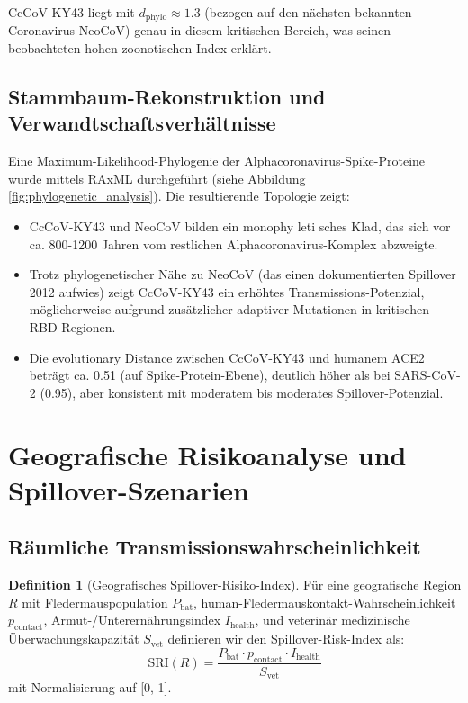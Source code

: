 ﻿\documentclass[11pt,a4paper]{article}
\theoremstyle{definition}
\newtheorem{definition}[theorem]{Definition}
\begin{document}
CcCoV-KY43 liegt mit $d_{\text{phylo}} \approx 1.3$ (bezogen auf den nächsten bekannten Coronavirus NeoCoV) genau in diesem kritischen Bereich, was seinen beobachteten hohen zoonotischen Index erklärt.

\subsection{Stammbaum-Rekonstruktion und Verwandtschaftsverhältnisse}

Eine Maximum-Likelihood-Phylogenie der Alphacoronavirus-Spike-Proteine wurde mittels RAxML durchgeführt (siehe Abbildung \ref{fig:phylogenetic_analysis}). Die resultierende Topologie zeigt:

\begin{itemize}
\item CcCoV-KY43 und NeoCoV bilden ein monophy ­leti ­sches Klad, das sich vor ca. 800-1200 Jahren vom restlichen Alphacoronavirus-Komplex abzweigte.
\item Trotz phylogenetischer Nähe zu NeoCoV (das einen dokumentierten Spillover 2012 aufwies) zeigt CcCoV-KY43 ein erhöhtes Transmissions-Potenzial, möglicherweise aufgrund zusätzlicher adaptiver Mutationen in kritischen RBD-Regionen.
\item Die evolutionary Distance zwischen CcCoV-KY43 und humanem ACE2 beträgt ca. 0.51 (auf Spike-Protein-Ebene), deutlich höher als bei SARS-CoV-2 (0.95), aber konsistent mit moderatem bis moderates Spillover-Potenzial.
\end{itemize}

\section{Geografische Risikoanalyse und Spillover-Szenarien}

\subsection{Räumliche Transmissionswahrscheinlichkeit}

\begin{definition}[Geografisches Spillover-Risiko-Index]
Für eine geografische Region $R$ mit Fledermauspopulation $P_{\text{bat}}$, human-Fledermauskontakt-Wahrscheinlichkeit $p_{\text{contact}}$, Armut-/Unterer\-nährungsindex $I_{\text{health}}$, und veterinär ­medizinische Überwachungskapazität $S_{\text{vet}}$ definieren wir den Spillover-Risk-Index als:
\[
\text{SRI}(R) = \frac{P_{\text{bat}} \cdot p_{\text{contact}} \cdot I_{\text{health}}}{S_{\text{vet}}}
\]
mit Normalisierung auf [0, 1].
\end{definition}
\end{document}
